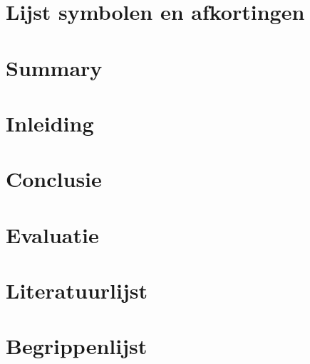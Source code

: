 \documentclass[a4paper,11pt, twoside]{article}
\begin{document}
	

	\tableofcontents
	\newpage

	\section{Lijst symbolen en afkortingen}
    \newpage

    \section{Summary}

    \section{Inleiding}
    

    
    
    
    

    \section{Conclusie}

    \section{Evaluatie}

    \section{Literatuurlijst}

    \newpage
    \appendix
    \section{Begrippenlijst}
\end{document}
